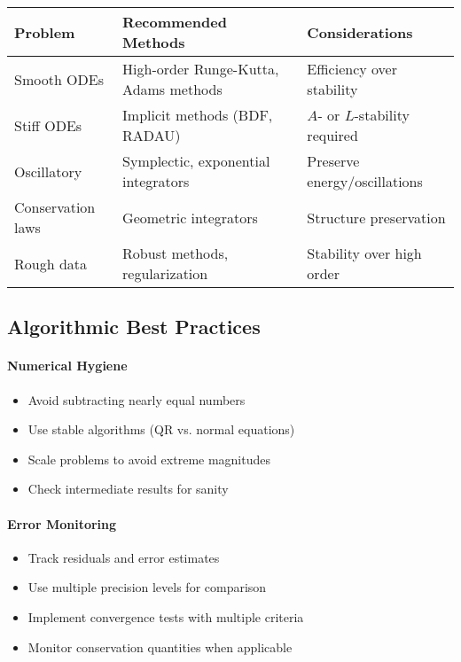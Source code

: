 \begin{center}
    \begin{tabular}{@{}l l l@{}}
        \toprule
        \textbf{Problem}  & \textbf{Recommended Methods}          & \textbf{Considerations}        \\
        \midrule
        Smooth ODEs       & High-order Runge-Kutta, Adams methods & Efficiency over stability      \\
        Stiff ODEs        & Implicit methods (BDF, RADAU)         & $A$- or $L$-stability required \\
        Oscillatory       & Symplectic, exponential integrators   & Preserve energy/oscillations   \\
        Conservation laws & Geometric integrators                 & Structure preservation         \\
        Rough data        & Robust methods, regularization        & Stability over high order      \\
        \bottomrule
    \end{tabular}
\end{center}

\subsection{Algorithmic Best Practices}
\label{subsec:best-practices}

\paragraph{Numerical Hygiene}
\begin{itemize}
    \item Avoid subtracting nearly equal numbers
    \item Use stable algorithms (QR vs. normal equations)
    \item Scale problems to avoid extreme magnitudes
    \item Check intermediate results for sanity
\end{itemize}

\paragraph{Error Monitoring}
\begin{itemize}
    \item Track residuals and error estimates
    \item Use multiple precision levels for comparison
    \item Implement convergence tests with multiple criteria
    \item Monitor conservation quantities when applicable
\end{itemize}

